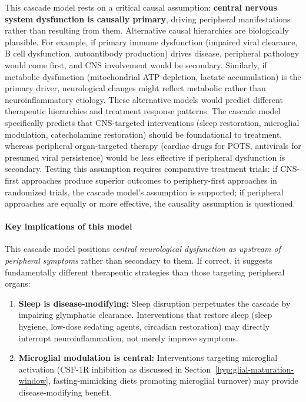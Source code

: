 \begin{hypothesis}
This cascade model rests on a critical causal assumption: \textbf{central nervous system dysfunction is causally primary}, driving peripheral manifestations rather than resulting from them. Alternative causal hierarchies are biologically plausible. For example, if primary immune dysfunction (impaired viral clearance, B cell dysfunction, autoantibody production) drives disease, peripheral pathology would come first, and CNS involvement would be secondary. Similarly, if metabolic dysfunction (mitochondrial ATP depletion, lactate accumulation) is the primary driver, neurological changes might reflect metabolic rather than neuroinflammatory etiology. These alternative models would predict different therapeutic hierarchies and treatment response patterns. The cascade model specifically predicts that CNS-targeted interventions (sleep restoration, microglial modulation, catecholamine restoration) should be foundational to treatment, whereas peripheral organ-targeted therapy (cardiac drugs for POTS, antivirals for presumed viral persistence) would be less effective if peripheral dysfunction is secondary. Testing this assumption requires comparative treatment trials: if CNS-first approaches produce superior outcomes to periphery-first approaches in randomized trials, the cascade model's assumption is supported; if peripheral approaches are equally or more effective, the causality assumption is questioned.

\paragraph{Key implications of this model}

This cascade model positions \textit{central neurological dysfunction as upstream of peripheral symptoms} rather than secondary to them. If correct, it suggests fundamentally different therapeutic strategies than those targeting peripheral organs:

\begin{enumerate}
    \item \textbf{Sleep is disease-modifying:} Sleep disruption perpetuates the cascade by impairing glymphatic clearance. Interventions that restore sleep (sleep hygiene, low-dose sedating agents, circadian restoration) may directly interrupt neuroinflammation, not merely improve symptoms.

    \item \textbf{Microglial modulation is central:} Interventions targeting microglial activation (CSF-1R inhibition as discussed in Section~\ref{hyp:glial-maturation-window}, fasting-mimicking diets promoting microglial turnover) may provide disease-modifying benefit.


\end{enumerate}
\end{hypothesis}
